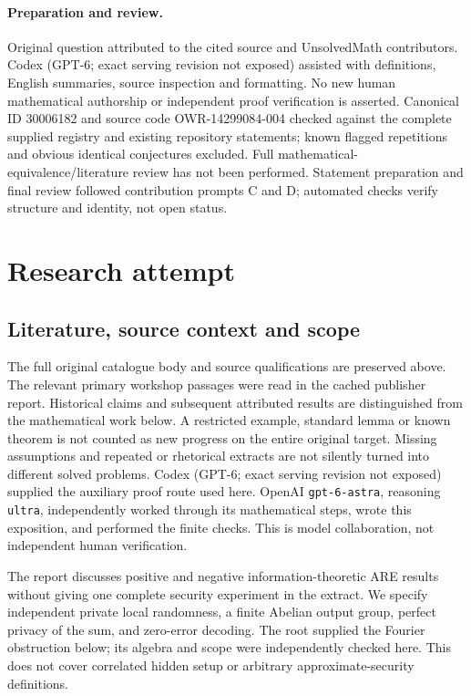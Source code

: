\documentclass[11pt]{article}
\begin{document}
\paragraph{Preparation and review.}
Original question attributed to the cited source and UnsolvedMath contributors. Codex (GPT-6; exact serving revision not exposed) assisted with definitions, English summaries, source inspection and formatting. No new human mathematical authorship or independent proof verification is asserted. Canonical ID 30006182 and source code OWR-14299084-004 checked against the complete supplied registry and existing repository statements; known flagged repetitions and obvious identical conjectures excluded. Full mathematical-equivalence/literature review has not been performed. Statement preparation and final review followed contribution prompts C and D; automated checks verify structure and identity, not open status.
\label{end:30006182}

\section{Research attempt}
\subsection{Literature, source context and scope}
The full original catalogue body and source qualifications are preserved above. The relevant primary workshop passages were read in the cached publisher report. Historical claims and subsequent attributed results are distinguished from the mathematical work below. A restricted example, standard lemma or known theorem is not counted as new progress on the entire original target. Missing assumptions and repeated or rhetorical extracts are not silently turned into different solved problems.
Codex (GPT-6; exact serving revision not exposed) supplied the auxiliary proof route used here. OpenAI \texttt{gpt-6-astra}, reasoning \texttt{ultra}, independently worked through its mathematical steps, wrote this exposition, and performed the finite checks. This is model collaboration, not independent human verification.

The report discusses positive and negative information-theoretic ARE results without giving one complete security experiment in the extract. We specify independent private local randomness, a finite Abelian output group, perfect privacy of the sum, and zero-error decoding. The root supplied the Fourier obstruction below; its algebra and scope were independently checked here. This does not cover correlated hidden setup or arbitrary approximate-security definitions.
\end{document}
